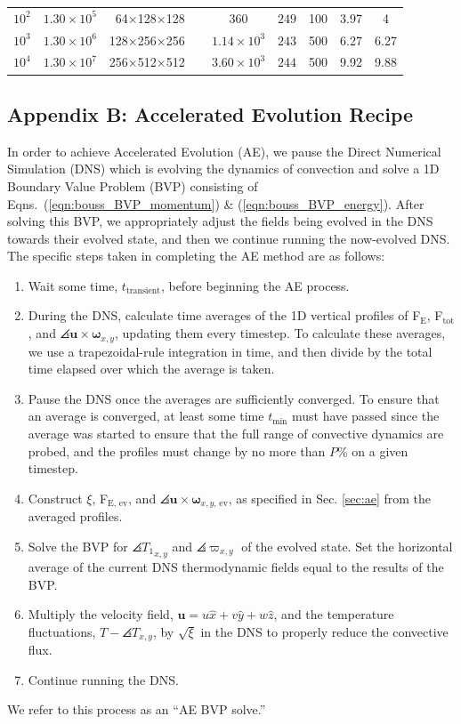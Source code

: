 \begin{table}
\begin{center}
\begin{tabular}{ c c r | c c c  | c c  }
$10^2$          &	$1.30 \times 10^5$	&	64$\times$128$\times$128$\,\,\,\,\,\,\,$   &	$360$	&	$249$	&	100	&	3.97	&	4	\\
$10^3$          &	$1.30 \times 10^6$	&	128$\times$256$\times$256$\,\,\,\,\,\,\,$	&	$1.14 \times 10^3$	&	$243$	&	500	&	6.27	&	6.27	\\
$10^4$          &	$1.30 \times 10^7$	&	256$\times$512$\times$512$\,\,\,\,\,\,\,$	&	$3.60 \times 10^3$	&	$244$	&	500	&	9.92	&	9.88	\\
\hline																	
\end{tabular}
\end{center}
\end{table}


\subsection{Appendix B: Accelerated Evolution Recipe}
\label{appendix:recipe}
In order to achieve Accelerated Evolution (AE), we pause the Direct Numerical Simulation (DNS)
which is evolving the dynamics of convection and solve a 1D Boundary Value Problem (BVP)
consisting of Eqns.~(\ref{eqn:bouss_BVP_momentum}) \& (\ref{eqn:bouss_BVP_energy}).
After solving this BVP, we appropriately adjust the fields being evolved in the DNS
towards their evolved state, and then we continue running the now-evolved DNS.
The specific steps taken in completing the AE method are as follows:
\begin{enumerate}
\item Wait some time, $t_{\text{transient}}$, before beginning the AE process.
\item During the DNS, calculate time averages of the 1D vertical profiles of
F$_{\text{E}}$, F$_{\text{tot}}$, 
and $\angles{\bm{u} \times \bm{\omega}}_{x,y}$, updating them every timestep.  
To calculate these
averages, we use a trapezoidal-rule integration in time, and then divide by the
total time elapsed over which the average is taken. 
\item Pause the DNS once the averages are sufficiently converged. 
To ensure that an average is converged, at
least some time $t_{\text{min}}$ must have passed since the average was started to
ensure that the full range of convective dynamics are probed, and
the profiles must change by no more than $P$\% on a given timestep.
\item Construct $\xi$, F$_{\text{E, ev}}$, and $\angles{\bm{u} \times \bm{\omega}}_{x,y\text{, ev}}$,
as specified in Sec. \ref{sec:ae}
from the averaged profiles.
\item Solve the BVP for $\angles{T_1}_{x,y}$ and $\angles{\varpi}_{x,y}$ of the
evolved state.  Set the horizontal average of the current DNS thermodynamic fields
equal to the results of the BVP.
\item Multiply the velocity field, $\bm{u} = u\hat{x} + v\hat{y} + w\hat{z}$,
and the temperature fluctuations, $T - \angles{T}_{x,y}$,
by $\sqrt{\xi}$ in the DNS to properly reduce the convective flux.
\item Continue running the DNS.
\end{enumerate}
We refer to this process as an ``AE BVP solve.''

